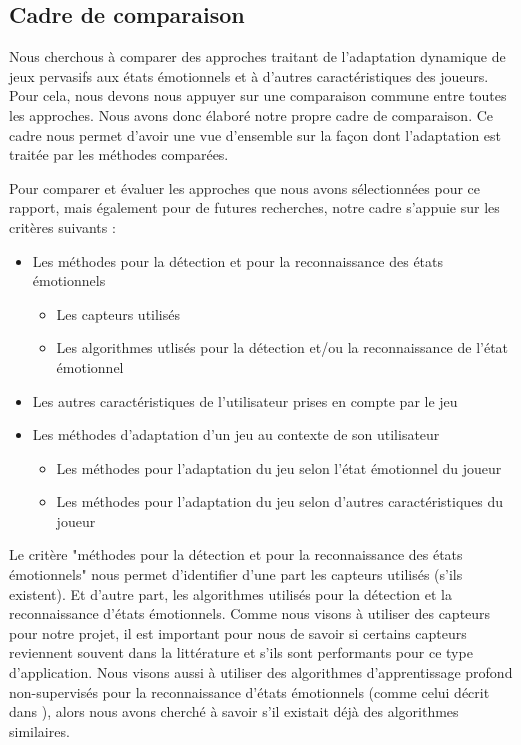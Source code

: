 \documentclass[11pt]{article}
\begin{document}
	\subsection{Cadre de comparaison}\label{sec:edacadre}
		Nous cherchous à comparer des approches traitant de l'adaptation dynamique de jeux pervasifs aux états émotionnels et à d'autres caractéristiques des joueurs.
		Pour cela, nous devons nous appuyer sur une comparaison commune entre toutes les approches.
		Nous avons donc élaboré notre propre cadre de comparaison. 
		Ce cadre nous permet d'avoir une vue d'ensemble sur la façon dont l'adaptation est traitée par les méthodes comparées.\par
		Pour comparer et évaluer les approches que nous avons sélectionnées pour ce rapport, mais également pour de futures recherches, notre cadre s'appuie sur les critères suivants :
		\begin{itemize}
			\item Les méthodes pour la détection et pour la reconnaissance des états émotionnels
			\begin{itemize}
				\item Les capteurs utilisés
				\item Les algorithmes utlisés pour la détection et/ou la reconnaissance de l'état émotionnel
			\end{itemize}
			\item Les autres caractéristiques de l'utilisateur prises en compte par le jeu
			\item Les méthodes d'adaptation d'un jeu au contexte de son utilisateur
			\begin{itemize}
				\item Les méthodes pour l'adaptation du jeu selon l'état émotionnel du joueur
				\item Les méthodes pour l'adaptation du jeu selon d'autres caractéristiques du joueur
			\end{itemize}
		\end{itemize}\par
		Le critère "méthodes pour la détection et pour la reconnaissance des états émotionnels" nous permet d'identifier d'une part les capteurs utilisés (s'ils existent).
		Et d'autre part, les algorithmes utilisés pour la détection et la reconnaissance d'états émotionnels.
		Comme nous visons à utiliser des capteurs pour notre projet, il est important pour nous de savoir si certains capteurs reviennent souvent dans la littérature et s'ils sont performants pour ce type d'application.
		Nous visons aussi à utiliser des algorithmes d'apprentissage profond non-supervisés pour la reconnaissance d'états émotionnels (comme celui décrit dans \cite{gal_et_al._2020}), alors nous avons cherché à savoir s'il existait déjà des algorithmes similaires.\par
\end{document}
